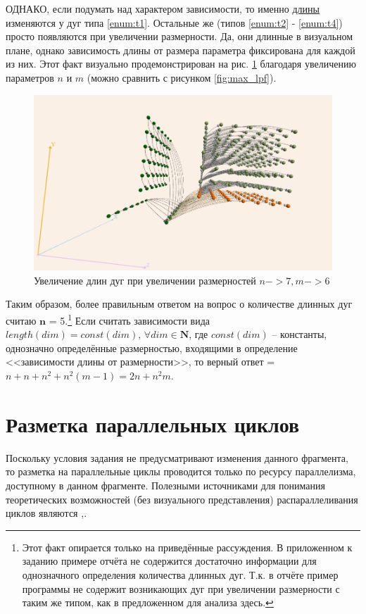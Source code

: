 \documentclass[12pt, fleqn]{article}
\theoremstyle{definition}
\newenvironment{packed_enum}{
\begin{enumerate}
  \setlength{\itemsep}{1pt}
  \setlength{\parskip}{0pt}
  \setlength{\parsep}{0pt}
}{\end{enumerate}}
\begin{document}
\begin{packed_enum}
ОДНАКО, если подумать над характером зависимости, то именно \underline{длины} изменяются у дуг типа \ref{enum:t1}. Остальные же (типов \ref{enum:t2} - \ref{enum:t4}) просто появляются при увеличении размерности. Да, они длинные в визуальном плане, однако зависимость длины от размера параметра фиксирована для каждой из них. Этот факт визуально продемонстрирован на рис. \ref{fig:length} благодаря увеличению параметров $n$ и $m$ (можно сравнить с рисунком \ref{fig:max_lpf}).
 \begin{figure}[ht]
\begin{center}
 \includegraphics[scale=0.96]{lengths.png}
 \caption{Увеличение длин дуг при увеличении размерностей $n->7, m->6$}
 \label{fig:length}
\end{center}
\end{figure}

Таким образом, более правильным ответом на вопрос о количестве длинных дуг считаю $\mathbf{n}$ = 5.\footnote{Этот факт опирается только на приведённые рассуждения. В приложенном к заданию примере отчёта не содержится достаточно информации для однозначного определения количества длинных дуг. Т.к. в отчёте пример программы не содержит возникающих дуг при увеличении размерности с таким же типом, как в предложенном для анализа здесь.}
Если считать зависимости вида $length(dim) = const(dim), \, \forall dim \in \mathbf{N}$, где $const(dim)$ -- константы, однозначно определённые размерностью, входящими в определение <<зависимости длины от размерности>>, то верный ответ = $n + n + n^2 + n^2 (m - 1) = 2n + n^2m$.
\end{packed_enum}

\section{Разметка параллельных циклов}
Поскольку условия задания не предусматривают изменения данного фрагмента, то разметка на параллельные циклы проводится только по ресурсу параллелизма, доступному в данном фрагменте.
Полезными источниками для понимания теоретических возможностей (без визуального представления) распараллеливания циклов являются \cite{lobanov5},\cite{lobanov6}.
\end{document}
